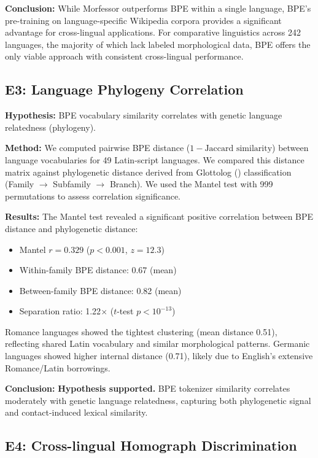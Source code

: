 \documentclass[11pt]{article}
\begin{document}
\textbf{Conclusion:} While Morfessor outperforms BPE within a single language, BPE's pre-training on language-specific Wikipedia corpora provides a significant advantage for cross-lingual applications. For comparative linguistics across 242 languages, the majority of which lack labeled morphological data, BPE offers the only viable approach with consistent cross-lingual performance.

\subsection{E3: Language Phylogeny Correlation}
\label{sec:e3}

\textbf{Hypothesis:} BPE vocabulary similarity correlates with genetic language relatedness (phylogeny).

\textbf{Method:} We computed pairwise BPE distance ($1 - \text{Jaccard similarity}$) between language vocabularies for 49 Latin-script languages. We compared this distance matrix against phylogenetic distance derived from Glottolog (\citealt{glottolog}) classification (Family $\to$ Subfamily $\to$ Branch). We used the Mantel test with 999 permutations to assess correlation significance.

\textbf{Results:} The Mantel test revealed a significant positive correlation between BPE distance and phylogenetic distance:
\begin{itemize}[noitemsep]
    \item Mantel $r = 0.329$ ($p < 0.001$, $z = 12.3$)
    \item Within-family BPE distance: 0.67 (mean)
    \item Between-family BPE distance: 0.82 (mean)
    \item Separation ratio: 1.22$\times$ ($t$-test $p < 10^{-13}$)
\end{itemize}

Romance languages showed the tightest clustering (mean distance 0.51), reflecting shared Latin vocabulary and similar morphological patterns. Germanic languages showed higher internal distance (0.71), likely due to English's extensive Romance/Latin borrowings.

\textbf{Conclusion:} \textbf{Hypothesis supported.} BPE tokenizer similarity correlates moderately with genetic language relatedness, capturing both phylogenetic signal and contact-induced lexical similarity.

\subsection{E4: Cross-lingual Homograph Discrimination}
\label{sec:e4}
\end{document}
